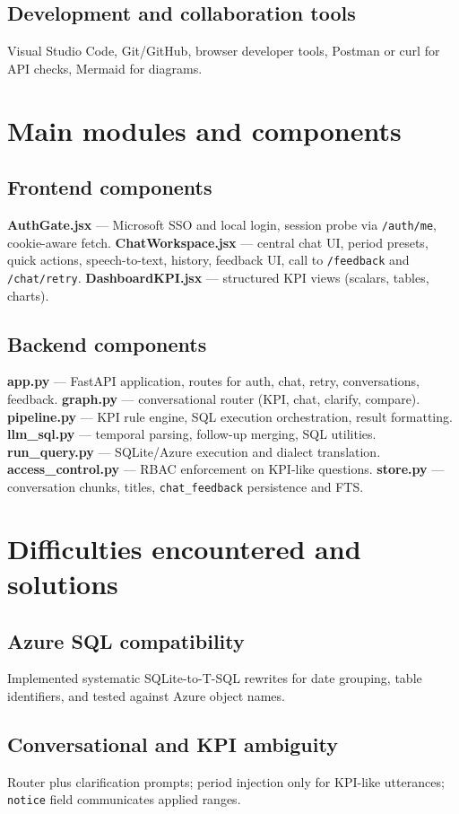 \documentclass[12pt,a4paper,openany]{report}
\begin{document}
\subsection{Development and collaboration tools}
Visual Studio Code, Git/GitHub, browser developer tools, Postman or curl for API checks, Mermaid for diagrams.

\section{Main modules and components}
\subsection{Frontend components}
\textbf{AuthGate.jsx} --- Microsoft SSO and local login, session probe via \texttt{/auth/me}, cookie-aware fetch. \textbf{ChatWorkspace.jsx} --- central chat UI, period presets, quick actions, speech-to-text, history, feedback UI, call to \texttt{/feedback} and \texttt{/chat/retry}. \textbf{DashboardKPI.jsx} --- structured KPI views (scalars, tables, charts).

\subsection{Backend components}
\textbf{app.py} --- FastAPI application, routes for auth, chat, retry, conversations, feedback. \textbf{graph.py} --- conversational router (KPI, chat, clarify, compare). \textbf{pipeline.py} --- KPI rule engine, SQL execution orchestration, result formatting. \textbf{llm\_sql.py} --- temporal parsing, follow-up merging, SQL utilities. \textbf{run\_query.py} --- SQLite/Azure execution and dialect translation. \textbf{access\_control.py} --- RBAC enforcement on KPI-like questions. \textbf{store.py} --- conversation chunks, titles, \texttt{chat\_feedback} persistence and FTS.

\section{Difficulties encountered and solutions}
\subsection{Azure SQL compatibility}
Implemented systematic SQLite-to-T-SQL rewrites for date grouping, table identifiers, and tested against Azure object names.

\subsection{Conversational and KPI ambiguity}
Router plus clarification prompts; period injection only for KPI-like utterances; \texttt{notice} field communicates applied ranges.
\end{document}
